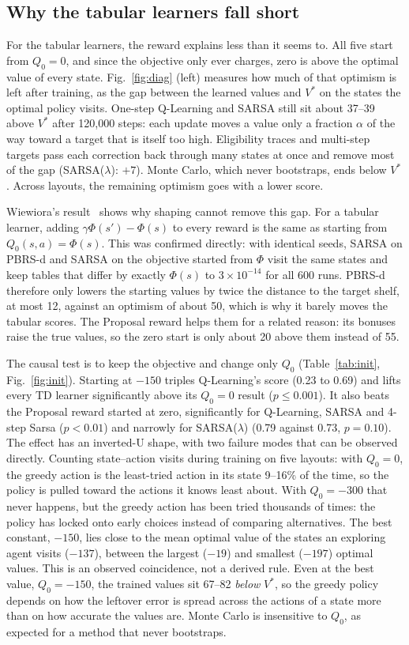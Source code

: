 \subsection{Why the tabular learners fall short}
\label{sec:why}
For the tabular learners, the reward explains less than it seems to. All five start from $Q_0=0$, and since the objective only ever charges, zero is above the optimal value of every state. Fig.~\ref{fig:diag} (left) measures how much of that optimism is left after training, as the gap between the learned values and $V^\ast$ on the states the optimal policy visits. One-step Q-Learning and SARSA still sit about 37--39 above $V^\ast$ after 120{,}000 steps: each update moves a value only a fraction $\alpha$ of the way toward a target that is itself too high. Eligibility traces and multi-step targets pass each correction back through many states at once and remove most of the gap (SARSA($\lambda$): $+7$). Monte Carlo, which never bootstraps, ends below $V^\ast$. Across layouts, the remaining optimism goes with a lower score.

Wiewiora's result~\cite{wiewiora2003} shows why shaping cannot remove this gap. For a tabular learner, adding $\gamma\Phi(s')-\Phi(s)$ to every reward is the same as starting from $Q_0(s,a)=\Phi(s)$. This was confirmed directly: with identical seeds, SARSA on PBRS-d and SARSA on the objective started from $\Phi$ visit the same states and keep tables that differ by exactly $\Phi(s)$ to $3\times10^{-14}$ for all 600 runs. PBRS-d therefore only lowers the starting values by twice the distance to the target shelf, at most 12, against an optimism of about 50, which is why it barely moves the tabular scores. The Proposal reward helps them for a related reason: its bonuses raise the true values, so the zero start is only about 20 above them instead of 55.

The causal test is to keep the objective and change only $Q_0$ (Table~\ref{tab:init}, Fig.~\ref{fig:init}). Starting at $-150$ triples Q-Learning's score (0.23 to 0.69) and lifts every TD learner significantly above its $Q_0=0$ result ($p\le0.001$). It also beats the Proposal reward started at zero, significantly for Q-Learning, SARSA and 4-step Sarsa ($p<0.01$) and narrowly for SARSA($\lambda$) (0.79 against 0.73, $p=0.10$). The effect has an inverted-U shape, with two failure modes that can be observed directly. Counting state--action visits during training on five layouts: with $Q_0=0$, the greedy action is the least-tried action in its state 9--16\% of the time, so the policy is pulled toward the actions it knows least about. With $Q_0=-300$ that never happens, but the greedy action has been tried thousands of times: the policy has locked onto early choices instead of comparing alternatives. The best constant, $-150$, lies close to the mean optimal value of the states an exploring agent visits ($-137$), between the largest ($-19$) and smallest ($-197$) optimal values. This is an observed coincidence, not a derived rule. Even at the best value, $Q_0=-150$, the trained values sit 67--82 \emph{below} $V^\ast$, so the greedy policy depends on how the leftover error is spread across the actions of a state more than on how accurate the values are. Monte Carlo is insensitive to $Q_0$, as expected for a method that never bootstraps.

